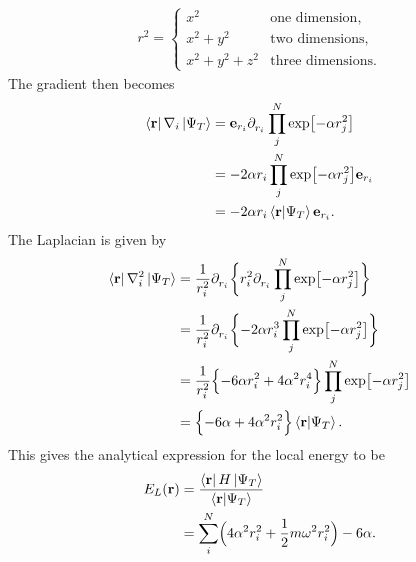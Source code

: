 \documentclass[
    a4paper, aps, twocolumn, floatfix, superscriptaddress]{revtex4-1}
\newcommand{\vf}{\mathbf}
\newcommand{\1}{\mathds{1}}
\newcommand{\tpl}[1]{\tensor{\partial}{_#1}} %
\newcommand{\half}{\frac{1}{2}}
\begin{document}
            \begin{align}
                r^2 =
                \begin{cases}
                    x^2 & \text{one dimension}, \\
                    x^2 + y^2 & \text{two dimensions}, \\
                    x^2 + y^2 + z^2 & \text{three dimensions}.
                \end{cases}
            \end{align}
            The gradient then becomes
            \begin{align}
                \bra{\vf{r}}\nabla_i\ket{\Psi_T}
                &= \vf{e}_{{r_i}}\tpl{{r_i}}\prod_j^N\exp\bigl[
                    -\alpha r_j^2
                \bigr] \\
                &=
                -2\alpha r_i\prod_j^N\exp\bigl[
                    -\alpha r_j^2
                \bigr]\vf{e}_{{r_i}} \\
                &=
                -2\alpha r_i\bra{\vf{r}}\ket{\Psi_T}\vf{e}_{{r_i}}.
            \end{align}
            The Laplacian is given by
            \begin{align}
                \bra{\vf{r}}\nabla_i^2\ket{\Psi_T}
                &= \frac{1}{r_i^2}\tpl{{r_i}}
                \biggl\{
                    r_i^2\tpl{{r_i}}
                    \prod_j^N\exp\bigl[
                        -\alpha r_j^2
                    \bigr]
                \biggr\} \\
                &=
                \frac{1}{r_i^2}\tpl{{r_i}}
                \biggl\{
                    -2 \alpha r_i^3
                    \prod_j^N\exp\bigl[
                        -\alpha r_j^2
                    \bigr]
                \biggr\} \\
                &=
                \frac{1}{r_i^2}
                \Bigl\{
                    -6 \alpha r_i^2
                    + 4\alpha^2 r_i^4
                \Bigr\}
                \prod_j^N\exp\bigl[
                    -\alpha r_j^2
                \bigr]
                \\
                &=
                \Bigl\{
                    -6 \alpha
                    + 4\alpha^2 r_i^2
                \Bigr\}
                \bra{\vf{r}}\ket{\Psi_T}.
            \end{align}
            This gives the analytical expression for the local energy to be
            \begin{align}
                E_L(\vf{r})
                &= \frac{\bra{\vf{r}}H\ket{\Psi_T}}{\bra{\vf{r}}\ket{\Psi_T}} \\
                &= \sum_i^N \Bigl(
                    4\alpha^2 r_i^2
                    + \half m \omega^2 r_i^2
                \Bigr) - 6\alpha.
            \end{align}
\end{document}
